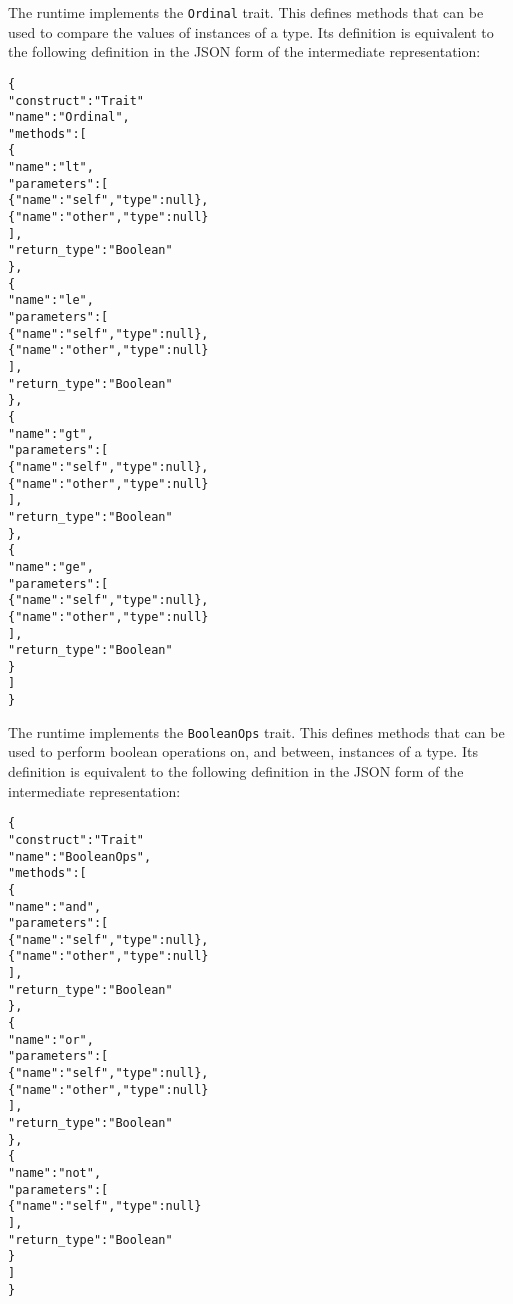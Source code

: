 \documentclass[10pt,twocolumn,a4paper]{article}
\newcommand{\code}[1]{\texttt{#1}}
\begin{document}
The runtime implements the \code{Ordinal} trait. This defines methods that
can be used to compare the values of instances of a type. 
Its definition is equivalent to the following definition in the JSON
form of the intermediate representation:
\footnotesize
\begin{alltt}
  \{
    "construct" : "Trait"
    "name"      : "Ordinal",
    "methods"   : [
      \{
        "name"        : "lt",
        "parameters"  : [
          \{"name" : "self",  "type"   : null\},
          \{"name" : "other", "type"   : null\}
        ],
        "return\_type" : "Boolean"
      \},
      \{
        "name"        : "le",
        "parameters"  : [
          \{"name" : "self",  "type"   : null\},
          \{"name" : "other", "type"   : null\}
        ],
        "return\_type" : "Boolean"
      \},
      \{
        "name"        : "gt",
        "parameters"  : [
          \{"name" : "self",  "type"   : null\},
          \{"name" : "other", "type"   : null\}
        ],
        "return\_type" : "Boolean"
      \},
      \{
        "name"        : "ge",
        "parameters"  : [
          \{"name" : "self",  "type"   : null\},
          \{"name" : "other", "type"   : null\}
        ],
        "return\_type" : "Boolean"
      \}
    ]
  \}
\end{alltt}
\normalsize

The runtime implements the \code{BooleanOps} trait. This defines methods
that can be used to perform boolean operations on, and between, instances
of a type.
Its definition is equivalent to the following definition in the JSON
form of the intermediate representation:
\footnotesize
\begin{alltt}
  \{
    "construct" : "Trait"
    "name"      : "BooleanOps",
    "methods"   : [
      \{
        "name"        : "and",
        "parameters"  : [
          \{"name" : "self",  "type"   : null\},
          \{"name" : "other", "type"   : null\}
        ],
        "return\_type" : "Boolean"
      \},
      \{
        "name"        : "or",
        "parameters"  : [
          \{"name" : "self",  "type"   : null\},
          \{"name" : "other", "type"   : null\}
        ],
        "return\_type" : "Boolean"
      \},
      \{
        "name"        : "not",
        "parameters"  : [
          \{"name" : "self",  "type"   : null\}
        ],
        "return\_type" : "Boolean"
      \}
    ]
  \}
\end{alltt}
\normalsize
\end{document}
